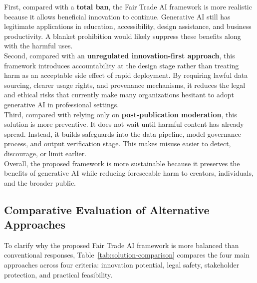 First, compared with a \textbf{total ban}, the Fair Trade AI framework is more realistic because it allows beneficial innovation to continue. Generative AI still has legitimate applications in education, accessibility, design assistance, and business productivity. A blanket prohibition would likely suppress these benefits along with the harmful uses. \\

Second, compared with an \textbf{unregulated innovation-first approach}, this framework introduces accountability at the design stage rather than treating harm as an acceptable side effect of rapid deployment. By requiring lawful data sourcing, clearer usage rights, and provenance mechanisms, it reduces the legal and ethical risks that currently make many organizations hesitant to adopt generative AI in professional settings. \\

Third, compared with relying only on \textbf{post-publication moderation}, this solution is more preventive. It does not wait until harmful content has already spread. Instead, it builds safeguards into the data pipeline, model governance process, and output verification stage. This makes misuse easier to detect, discourage, or limit earlier. \\

Overall, the proposed framework is more sustainable because it preserves the benefits of generative AI while reducing foreseeable harm to creators, individuals, and the broader public.

\subsection{Comparative Evaluation of Alternative Approaches}
To clarify why the proposed Fair Trade AI framework is more balanced than conventional responses, Table~\ref{tab:solution-comparison} compares the four main approaches across four criteria: innovation potential, legal safety, stakeholder protection, and practical feasibility.

